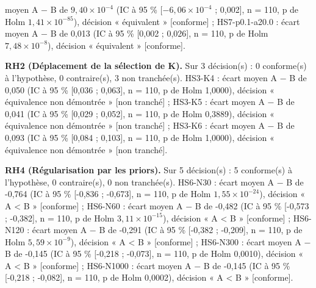 moyen A $-$ B de $9{,}40 \times 10^{-4}$ (IC à 95 \% [$-6{,}06 \times 10^{-4}$ ; 0,002], n = 110, p de Holm $1{,}41 \times 10^{-85}$), décision « équivalent » [conforme] ; HS7-p0.1-a20.0 : écart moyen A $-$ B de 0,013 (IC à 95 \% [0,002 ; 0,026], n = 110, p de Holm $7{,}48 \times 10^{-8}$), décision « équivalent » [conforme].

\textbf{RH2 (Déplacement de la sélection de K).} Sur 3 décision(s) : 0 conforme(s) à l'hypothèse, 0 contraire(s), 3 non tranchée(s). HS3-K4 : écart moyen A $-$ B de 0,050 (IC à 95 \% [0,036 ; 0,063], n = 110, p de Holm 1,0000), décision « équivalence non démontrée » [non tranché] ; HS3-K5 : écart moyen A $-$ B de 0,041 (IC à 95 \% [0,029 ; 0,052], n = 110, p de Holm 0,3889), décision « équivalence non démontrée » [non tranché] ; HS3-K6 : écart moyen A $-$ B de 0,093 (IC à 95 \% [0,084 ; 0,103], n = 110, p de Holm 1,0000), décision « équivalence non démontrée » [non tranché].

\textbf{RH4 (Régularisation par les priors).} Sur 5 décision(s) : 5 conforme(s) à l'hypothèse, 0 contraire(s), 0 non tranchée(s). HS6-N30 : écart moyen A $-$ B de -0,764 (IC à 95 \% [-0,836 ; -0,673], n = 110, p de Holm $1{,}55 \times 10^{-24}$), décision « A < B » [conforme] ; HS6-N60 : écart moyen A $-$ B de -0,482 (IC à 95 \% [-0,573 ; -0,382], n = 110, p de Holm $3{,}11 \times 10^{-15}$), décision « A < B » [conforme] ; HS6-N120 : écart moyen A $-$ B de -0,291 (IC à 95 \% [-0,382 ; -0,209], n = 110, p de Holm $5{,}59 \times 10^{-9}$), décision « A < B » [conforme] ; HS6-N300 : écart moyen A $-$ B de -0,145 (IC à 95 \% [-0,218 ; -0,073], n = 110, p de Holm 0,0010), décision « A < B » [conforme] ; HS6-N1000 : écart moyen A $-$ B de -0,145 (IC à 95 \% [-0,218 ; -0,082], n = 110, p de Holm 0,0002), décision « A < B » [conforme].
